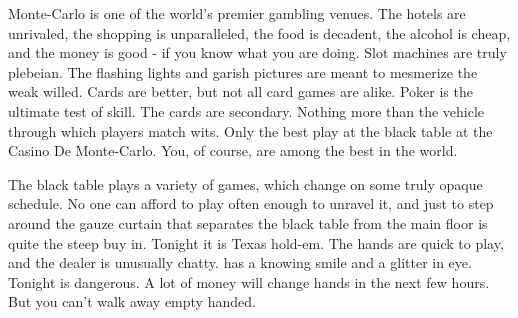\documentclass[blue]{AtlanticCity}
\begin{document}
\name{\bSetting{}}

Monte-Carlo is one of the world's premier gambling venues. The hotels are unrivaled, the shopping is unparalleled, the food is decadent, the alcohol is cheap, and the money is good - if you know what you are doing. Slot machines are truly plebeian. The flashing lights and garish pictures are meant to mesmerize the weak willed. Cards are better, but not all card games are alike. Poker is the ultimate test of skill. The cards are secondary. Nothing more than the vehicle through which players match wits. Only the best play at the black table at the Casino De Monte-Carlo. You, of course, are among the best in the world.

The black table plays a variety of games, which change on some truly opaque schedule. No one can afford to play often enough to unravel it, and just to step around the gauze curtain that separates the black table from the main floor is quite the steep buy in. Tonight it is Texas hold-em. The hands are quick to play, and the dealer is unusually chatty. \cDealer{\They} has a knowing smile and a glitter in \cDealer{\their} eye. Tonight is dangerous. A lot of money will change hands in the next few hours. But you can't walk away empty handed.
\end{document}
